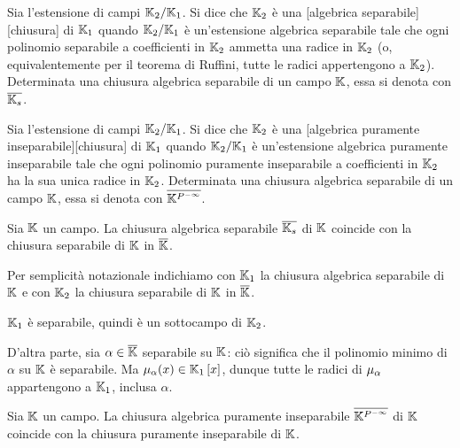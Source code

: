 \begin{Definition}
	Sia l'estensione di campi $\mathbb{K}_2/\mathbb{K}_1$. Si dice che $\mathbb{K}_2$ \`e una [algebrica separabile][chiusura] di $\mathbb{K}_1$ quando $\mathbb{K}_2/\mathbb{K}_1$ \`e un'estensione algebrica separabile tale che ogni polinomio separabile a coefficienti in $\mathbb{K}_2$ ammetta una radice in $\mathbb{K}_2$ (o, equivalentemente per il teorema di Ruffini, tutte le radici appertengono a $\mathbb{K}_2$). Determinata una chiusura algebrica separabile di un campo $\mathbb{K}$, essa si denota con $\SeparableAlgebraicClosure{\Field}$.
\end{Definition}
\begin{Definition}
	Sia l'estensione di campi $\mathbb{K}_2/\mathbb{K}_1$. Si dice che $\mathbb{K}_2$ \`e una [algebrica puramente inseparabile][chiusura] di $\mathbb{K}_1$ quando $\mathbb{K}_2/\mathbb{K}_1$ \`e un'estensione algebrica puramente inseparabile tale che ogni polinomio puramente inseparabile a coefficienti in $\mathbb{K}_2$ ha la sua unica radice in $\mathbb{K}_2$. Determinata una chiusura algebrica separabile di un campo $\mathbb{K}$, essa si denota con $\UnseparableAlgebraicClosure{\Field}$.
\end{Definition}
\begin{Theorem}
	Sia $\mathbb{K}$ un campo. La chiusura algebrica separabile $\SeparableAlgebraicClosure{\Field}$ di $\mathbb{K}$ coincide con la chiusura separabile di $\mathbb{K}$ in $\overline{\mathbb{K}}$.
\end{Theorem}
\Proof Per semplicit\`a notazionale indichiamo con $\mathbb{K}_1$ la chiusura algebrica separabile di $\mathbb{K}$ e con $\mathbb{K}_2$ la chiusura separabile di $\mathbb{K}$ in $\overline{\mathbb{K}}$.
\par $\mathbb{K}_1$ \`e separabile, quindi \`e un sottocampo di $\mathbb{K}_2$.
\par D'altra parte, sia $\alpha \in \overline{\mathbb{K}}$ separabile su $\mathbb{K}$: ci\`o significa che il polinomio minimo di $\alpha$ su $\mathbb{K}$ \`e separabile. Ma $\MinimalPolynomial{\alpha}(x) \in \RingAdjunction{\Field_1}{x}$, dunque tutte le radici di $\MinimalPolynomial{\alpha}$ appartengono a $\mathbb{K}_1$, inclusa $\alpha$. \EndProof
\begin{Theorem}
	Sia $\mathbb{K}$ un campo. La chiusura algebrica puramente inseparabile $\UnseparableAlgebraicClosure{\Field}$ di $\mathbb{K}$ coincide con la chiusura puramente inseparabile di $\mathbb{K}$.
\end{Theorem}
